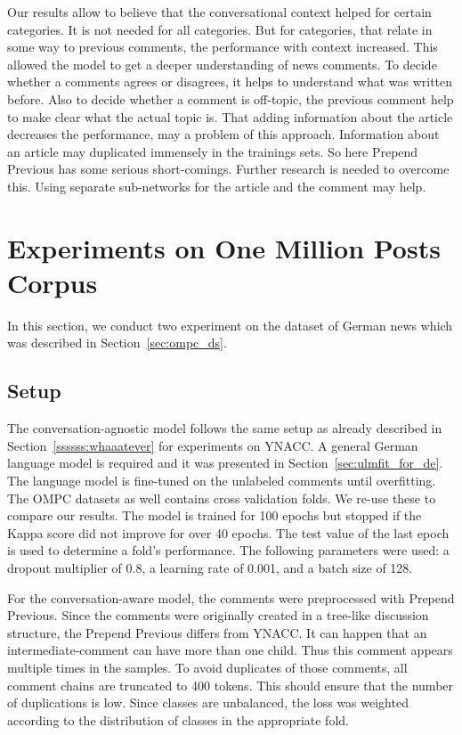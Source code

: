 Our results allow to believe that the conversational context helped for certain categories.
It is not needed for all categories.
But for categories, that relate in some way to previous comments, the performance with context increased.
This allowed the model to get a deeper understanding of news comments.
To decide whether a comments agrees or disagrees, it helps to understand what was written before.
Also to decide whether a comment is off-topic, the previous comment help to make clear what the actual topic is.
That adding information about the article decreases the performance, may a problem of this approach.
Information about an article may duplicated immensely in the trainings sets.
So here Prepend Previous has some serious short-comings.
Further research is needed to overcome this.
Using separate sub-networks for the article and the comment may help.


\section{Experiments on One Million Posts Corpus}

In this section, we conduct two experiment on the dataset of German news which was described in Section~\ref{sec:ompc_ds}.

\subsection{Setup}

The conversation-agnostic model follows the same setup as already described in Section~\ref{ssssss:whaaatever} for experiments on YNACC.
A general German language model is required and it was presented in Section~\ref{sec:ulmfit_for_de}.
The language model is fine-tuned on the unlabeled comments until overfitting.
The OMPC datasets as well contains cross validation folds.
We re-use these to compare our results.
The model is trained for 100 epochs but stopped if the Kappa score did not improve for over 40 epochs.
The test value of the last epoch is used to determine a fold's performance.
The following parameters were used: a dropout multiplier of 0.8, a learning rate of 0.001, and a batch size of 128.

For the conversation-aware model, the comments were preprocessed with Prepend Previous.
Since the comments were originally created in a tree-like discussion structure, the Prepend Previous differs from YNACC.
It can happen that an intermediate-comment can have more than one child.
Thus this comment appears multiple times in the samples.
To avoid duplicates of those comments, all comment chains are truncated to 400 tokens.
This should ensure that the number of duplications is low.
Since classes are unbalanced, the loss was weighted according to the distribution of classes in the appropriate fold.

